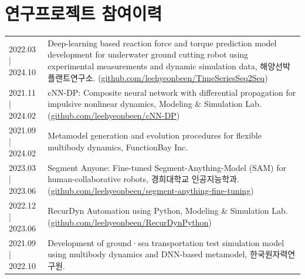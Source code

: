 \documentclass[a4paper,10pt]{extarticle}
\begin{document}
\section*{연구프로젝트 참여이력}
\noindent
{}
\vspace*{-.5cm}
\begin{longtable}{LR}
	{2022.03 | 2024.10} & Deep-learning based reaction force and torque prediction model development for underwater ground cutting robot using experimental measurements and dynamic simulation data, 해양선박플랜트연구소. (\href{https://github.com/leehyeonbeen/TimeSeriesSeq2Seq}{github.com/leehyeonbeen/TimeSeriesSeq2Seq}) \\
	{2021.11 | 2024.02} & cNN-DP: Composite neural network with differential propagation for impulsive nonlinear dynamics, Modeling \& Simulation Lab. (\href{https://github.com/leehyeonbeen/cNN-DP}{github.com/leehyeonbeen/cNN-DP})                                                                                  \\
	{2021.09 | 2024.02} & Metamodel generation and evolution procedures for flexible multibody dynamics, FunctionBay Inc.                                                                                                                                                                                               \\
	{2023.03 | 2023.06} & Segment Anyone: Fine-tuned Segment-Anything-Model (SAM) for human-collaborative robots, 경희대학교 인공지능학과. (\href{https://github.com/leehyeonbeen/segment-anything-fine-tuning}{github.com/leehyeonbeen/segment-anything-fine-tuning})                                                             \\
	{2022.12 | 2023.06} & RecurDyn Automation using Python, Modeling \& Simulation Lab. (\href{https://github.com/leehyeonbeen/RecurDynPython}{github.com/leehyeonbeen/RecurDynPython})                                                                                                                                 \\
	{2021.09 | 2022.10} & Development of ground·sea transportation test simulation model using multibody dynamics and DNN-based metamodel, 한국원자력연구원.                                                                                                                                                                    \\
\end{longtable}

% 

\end{document}
